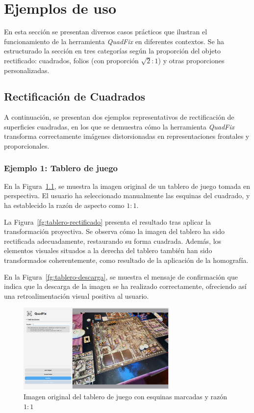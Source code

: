 
\chapter{Ejemplos de uso}
\label{ch:otro}

En esta sección se presentan diversos casos prácticos que ilustran el funcionamiento de la herramienta \textit{QuadFix} en diferentes contextos. Se ha estructurado la sección en tres categorías según la proporción del objeto rectificado: cuadrados, folios (con proporción $\sqrt{2}:1$) y otras proporciones personalizadas.


\section{Rectificación de Cuadrados}

A continuación, se presentan dos ejemplos representativos de rectificación de superficies cuadradas, en los que se demuestra cómo la herramienta \textit{QuadFix} transforma correctamente imágenes distorsionadas en representaciones frontales y proporcionales.

\subsection*{Ejemplo 1: Tablero de juego}

En la Figura~\ref{fg:tablero-original}, se muestra la imagen original de un tablero de juego tomada en perspectiva. El usuario ha seleccionado manualmente las esquinas del cuadrado, y ha establecido la razón de aspecto como $1:1$.

La Figura~\ref{fg:tablero-rectificado} presenta el resultado tras aplicar la transformación proyectiva. Se observa cómo la imagen del tablero ha sido rectificada adecuadamente, restaurando su forma cuadrada. Además, los elementos visuales situados a la derecha del tablero también han sido transformados coherentemente, como resultado de la aplicación de la homografía.

En la Figura~\ref{fg:tablero-descarga}, se muestra el mensaje de confirmación que indica que la descarga de la imagen se ha realizado correctamente, ofreciendo así una retroalimentación visual positiva al usuario.

\begin{figure}[H]
    \centering
    \includegraphics[width=0.70\textwidth]{figures/4.Examples/Cuadrado/Juego1.png}
    \caption{Imagen original del tablero de juego con esquinas marcadas y razón $1:1$}
    \label{fg:tablero-original}
\end{figure}

